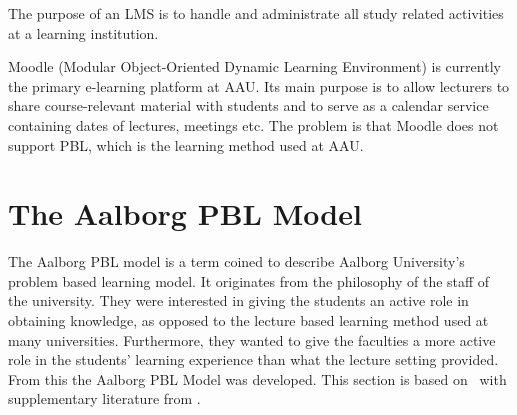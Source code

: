 The purpose of an LMS is to handle and administrate all study related activities at a learning institution.%

Moodle (Modular Object-Oriented Dynamic Learning Environment) \citep{moodle} is currently the primary e-learning platform at AAU. 
Its main purpose is to allow lecturers to share course-relevant material with students and to serve as a calendar service containing dates of lectures, meetings etc. 
The problem is that Moodle does not support PBL, which is the learning method used at AAU.

\section{The Aalborg PBL Model}
\label{sub:aaupbl}
The Aalborg PBL model is a term coined to describe Aalborg University's problem based learning model. 
It originates from the philosophy of the staff of the university. 
They were interested in giving the students an active role in obtaining knowledge, as opposed to the lecture based learning method used at many universities.
Furthermore, they wanted to give the faculties a more active role in the students' learning experience than what the lecture setting provided. 
From this the Aalborg PBL Model was developed. 
This section is based on~\citep{Barge10} with supplementary literature from \cite[pp.~9-16]{theaalborgpblmodel2004}.
